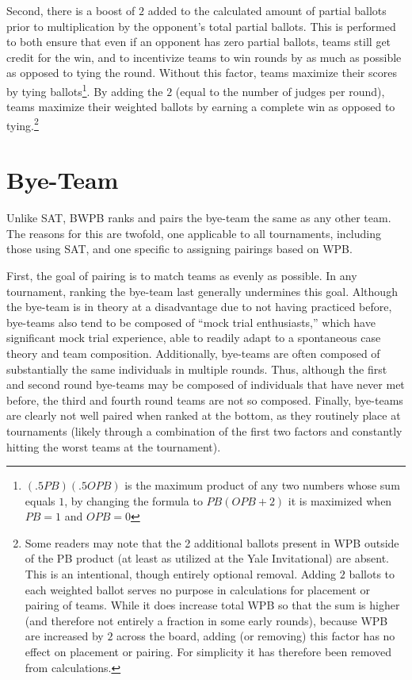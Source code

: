 \documentclass{article}
\begin{document}
Second, there is a boost of $2$ added to the calculated amount of partial ballots prior to multiplication by the opponent's total partial ballots.  This is performed to both ensure that even if an opponent has zero partial ballots, teams still get credit for the win, and to incentivize teams to win rounds by as much as possible as opposed to tying the round.  Without this factor, teams maximize their scores by tying ballots\footnote{$\left(.5PB\right)\left(.5OPB\right)$ is the maximum product of any two numbers whose sum equals $1$, by changing the formula to $PB\left(OPB+2\right)$ it is maximized when $PB=1$ and $OPB=0$}.  By adding the $2$ (equal to the number of judges per round), teams maximize their weighted ballots by earning a complete win as opposed to tying.\footnote{Some readers may note that the 2 additional ballots present in WPB outside of the PB product (at least as utilized at the Yale Invitational) are absent.  This is an intentional, though entirely optional removal.  Adding $2$ ballots to each weighted ballot serves no purpose in calculations for placement or pairing of teams.  While it does increase total WPB so that the sum is higher (and therefore not entirely a fraction in some early rounds), because WPB are increased by $2$ across the board, adding (or removing) this factor has no effect on placement or pairing.  For simplicity it has therefore been removed from calculations.}
\section{Bye-Team}
Unlike SAT, BWPB ranks and pairs the bye-team the same as any other team. The reasons for this are twofold, one applicable to all tournaments, including those using SAT, and one specific to assigning pairings based on WPB.

First, the goal of pairing is to match teams as evenly as possible. In any tournament, ranking the bye-team last generally undermines this goal. Although the bye-team is in theory at a disadvantage due to not having practiced before, bye-teams also tend to be composed of ``mock trial enthusiasts,'' which have significant mock trial experience, able to readily adapt to a spontaneous case theory and team composition. Additionally, bye-teams are often composed of substantially the same individuals in multiple rounds. Thus, although the first and second round bye-teams may be composed of individuals that have never met before, the third and fourth round teams are not so composed. Finally, bye-teams are clearly not well paired when ranked at the bottom, as they routinely place at tournaments (likely through a combination of the first two factors and constantly hitting the worst teams at the tournament).
\end{document}
